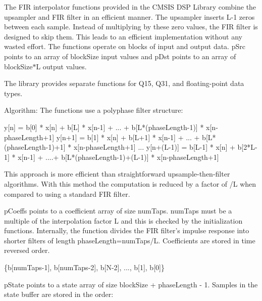 The F\-I\-R interpolator functions provided in the C\-M\-S\-I\-S D\-S\-P Library combine the upsampler and F\-I\-R filter in an efficient manner. The upsampler inserts {\ttfamily L-\/1} zeros between each sample. Instead of multiplying by these zero values, the F\-I\-R filter is designed to skip them. This leads to an efficient implementation without any wasted effort. The functions operate on blocks of input and output data. {\ttfamily p\-Src} points to an array of {\ttfamily block\-Size} input values and {\ttfamily p\-Dst} points to an array of {\ttfamily block\-Size$\ast$\-L} output values.

The library provides separate functions for Q15, Q31, and floating-\/point data types.

\begin{DoxyParagraph}{Algorithm\-: }
The functions use a polyphase filter structure\-: 
\begin{DoxyPre}   
   y[n] = b[0] * x[n] + b[L]   * x[n-1] + ... + b[L*(phaseLength-1)] * x[n-phaseLength+1]   
   y[n+1] = b[1] * x[n] + b[L+1] * x[n-1] + ... + b[L*(phaseLength-1)+1] * x[n-phaseLength+1]   
   ...   
   y[n+(L-1)] = b[L-1] * x[n] + b[2*L-1] * x[n-1] + ....+ b[L*(phaseLength-1)+(L-1)] * x[n-phaseLength+1]   
\end{DoxyPre}
 This approach is more efficient than straightforward upsample-\/then-\/filter algorithms. With this method the computation is reduced by a factor of {/\-L} when compared to using a standard F\-I\-R filter. 
\end{DoxyParagraph}
\begin{DoxyParagraph}{}
{\ttfamily p\-Coeffs} points to a coefficient array of size {\ttfamily num\-Taps}. {\ttfamily num\-Taps} must be a multiple of the interpolation factor {\ttfamily L} and this is checked by the initialization functions. Internally, the function divides the F\-I\-R filter's impulse response into shorter filters of length {\ttfamily phase\-Length=num\-Taps/\-L}. Coefficients are stored in time reversed order. 
\end{DoxyParagraph}
\begin{DoxyParagraph}{}

\begin{DoxyPre}   
   \{b[numTaps-1], b[numTaps-2], b[N-2], ..., b[1], b[0]\}   
\end{DoxyPre}
 
\end{DoxyParagraph}
\begin{DoxyParagraph}{}
{\ttfamily p\-State} points to a state array of size {\ttfamily block\-Size + phase\-Length -\/ 1}. Samples in the state buffer are stored in the order\-: 
\end{DoxyParagraph}
